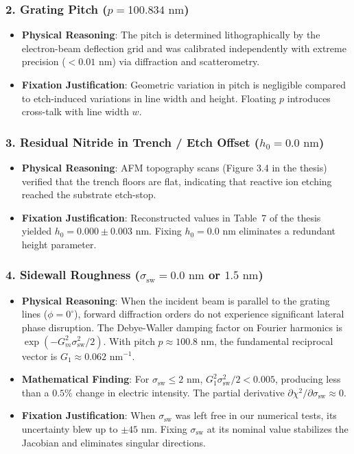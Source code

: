 \documentclass[11pt,a4paper]{article}
\begin{document}
\subsubsection{2. Grating Pitch \texorpdfstring{($p = 100.834\text{ nm}$)}{(p = 100.834 nm)}}
\begin{itemize}
    \item \textbf{Physical Reasoning}: The pitch is determined lithographically by the electron-beam deflection grid and was calibrated independently with extreme precision ($< 0.01\text{ nm}$) via diffraction and scatterometry.
    \item \textbf{Fixation Justification}: Geometric variation in pitch is negligible compared to etch-induced variations in line width and height. Floating $p$ introduces cross-talk with line width $w$.
\end{itemize}

\subsubsection{3. Residual Nitride in Trench / Etch Offset \texorpdfstring{($h_0 = 0.0\text{ nm}$)}{(h_0 = 0 nm)}}
\begin{itemize}
    \item \textbf{Physical Reasoning}: AFM topography scans (Figure 3.4 in the thesis) verified that the trench floors are flat, indicating that reactive ion etching reached the substrate etch-stop.
    \item \textbf{Fixation Justification}: Reconstructed values in Table~7 of the thesis yielded $h_0 = 0.000 \pm 0.003\text{ nm}$. Fixing $h_0 = 0.0\text{ nm}$ eliminates a redundant height parameter.
\end{itemize}

\subsubsection{4. Sidewall Roughness \texorpdfstring{($\sigma_{\mathrm{sw}} = 0.0\text{ nm}$ or $1.5\text{ nm}$)}{(sigma_sw = 0 nm or 1.5 nm)}}
\begin{itemize}
    \item \textbf{Physical Reasoning}: When the incident beam is parallel to the grating lines ($\phi = 0^\circ$), forward diffraction orders do not experience significant lateral phase disruption. The Debye-Waller damping factor on Fourier harmonics is $\exp(-G_m^2 \sigma_{\mathrm{sw}}^2 / 2)$. With pitch $p \approx 100.8\text{ nm}$, the fundamental reciprocal vector is $G_1 \approx 0.062\text{ nm}^{-1}$.
    \item \textbf{Mathematical Finding}: For $\sigma_{\mathrm{sw}} \le 2\text{ nm}$, $G_1^2 \sigma_{\mathrm{sw}}^2 / 2 < 0.005$, producing less than a $0.5\%$ change in electric intensity. The partial derivative $\partial \chi^2 / \partial \sigma_{\mathrm{sw}} \approx 0$.
    \item \textbf{Fixation Justification}: When $\sigma_{\mathrm{sw}}$ was left free in our numerical tests, its uncertainty blew up to $\pm 45\text{ nm}$. Fixing $\sigma_{\mathrm{sw}}$ at its nominal value stabilizes the Jacobian and eliminates singular directions.
\end{itemize}
\end{document}
